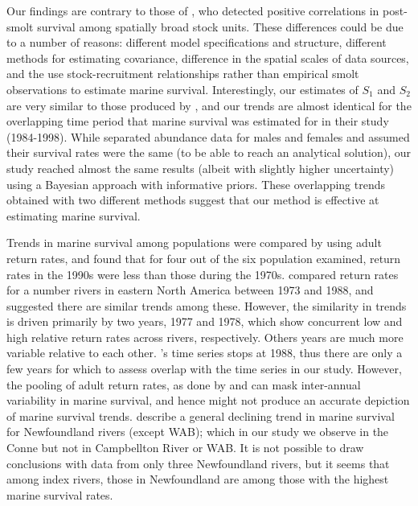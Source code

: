 \documentclass[12pt]{article}
\newcommand{\So}{$S_{1}$\xspace}
\newcommand{\St}{$S_{2}$\xspace}
\begin{document}
Our findings are contrary to those of \citet{Olmos2019}, who detected positive
correlations in post-smolt survival among spatially broad stock units. These differences
could be due to a number of reasons: different model specifications and
structure, different methods for estimating covariance, difference in the
spatial scales of data sources, and the use stock-recruitment relationships
rather than empirical smolt observations to estimate marine survival.
Interestingly, our estimates of \So and \St are very similar to those produced
by \citet{Chaput2003b}, and our trends are almost identical for the
overlapping time period that marine survival was estimated for in their study
(1984-1998). 
While \citet{Chaput2003b} separated abundance data for males and females
and assumed their survival rates were the same (to be able to reach an
analytical solution), our study reached almost the same results (albeit with
slightly higher uncertainty) using a Bayesian approach with informative
priors. These overlapping trends obtained with two different methods 
suggest that our method is effective at estimating marine survival.

Trends in marine survival
among populations were compared by \citet{Chaput2012a} using adult return rates, 
and found that for four out of the six population examined, return rates in the 1990s 
were less than those during the 1970s.
\citet{Friedland1993} compared return rates for a number rivers in eastern
North America between 1973 and 1988, and suggested there are similar trends among these. 
However, the similarity in trends is driven primarily by two years, 1977 and 1978, which
show concurrent low and high relative return rates across rivers,
respectively. Others years are much more variable relative to each other.
\citeauthor{Friedland1993}'s \citeyear{Friedland1993} time series stops at
1988, thus there are only a few years for which to assess overlap with the
time series in our study.
However, the pooling of adult return rates, as done by \citet{Chaput2012a} and
\citet{Friedland1993} can mask inter-annual variability in marine survival,
and hence might not produce an accurate depiction of marine survival trends.
\citet{Dempson2003} describe a general declining trend in marine survival for
Newfoundland rivers (except WAB); which in our study we observe in the
Conne but not in Campbellton River or WAB. It is not possible to draw conclusions
with data from only three Newfoundland rivers, but it seems that among index rivers,
those in Newfoundland are among those with the highest marine survival rates.
\end{document}
